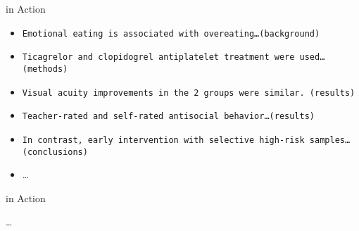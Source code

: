 \begin{frame}{\alps{} in Action}
    \begin{itemize}
        \item[] \texttt{Emotional eating is associated with overeating\dots (background)}
        \item[] \textcolor{hard}{\texttt{Ticagrelor and clopidogrel antiplatelet
            treatment were used\dots (methods)}}
        \item[] \textcolor{easy}{\texttt{Visual acuity improvements in the 2 groups were similar. (results)}}
		\item[] \texttt{Teacher-rated and self-rated antisocial behavior\dots (results)}
		\item[] \texttt{In contrast, early intervention with selective high-risk samples\dots  (conclusions)}
		\item[] \dots
    \end{itemize}
\end{frame}


\begin{frame}{\alps{} in Action}
    \centering
    \renewcommand{\arraystretch}{2}
    \begin{table}
    \end{table}
    \dots
\end{frame}

